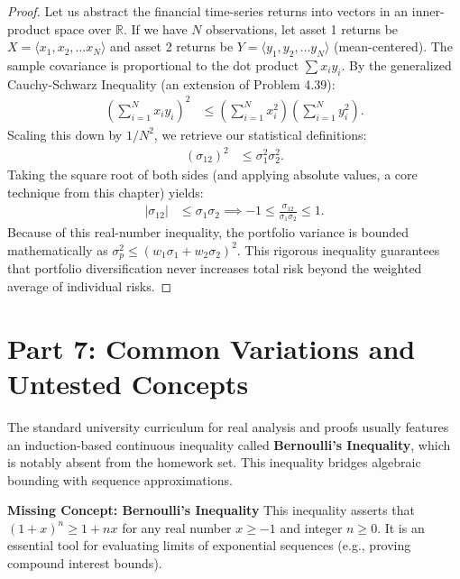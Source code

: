 \documentclass[11pt]{article}
\theoremstyle{definition}
\theoremstyle{remark}
\begin{document}
\begin{itemize}
\begin{proof}
Let us abstract the financial time-series returns into vectors in an inner-product space over $\mathbb{R}$. If we have $N$ observations, let asset 1 returns be $X = \langle x_1, x_2, \dots x_N \rangle$ and asset 2 returns be $Y = \langle y_1, y_2, \dots y_N \rangle$ (mean-centered). 
The sample covariance is proportional to the dot product $\sum x_i y_i$. 
By the generalized Cauchy-Schwarz Inequality (an extension of Problem 4.39):
\begin{align*}
    \left( \sum_{i=1}^N x_i y_i \right)^2 &\le \left( \sum_{i=1}^N x_i^2 \right) \left( \sum_{i=1}^N y_i^2 \right).
\end{align*}
Scaling this down by $1/N^2$, we retrieve our statistical definitions:
\begin{align*}
    (\sigma_{12})^2 &\le \sigma_1^2 \sigma_2^2.
\end{align*}
Taking the square root of both sides (and applying absolute values, a core technique from this chapter) yields:
\begin{align*}
    |\sigma_{12}| &\le \sigma_1 \sigma_2 \implies -1 \le \frac{\sigma_{12}}{\sigma_1 \sigma_2} \le 1.
\end{align*}
Because of this real-number inequality, the portfolio variance is bounded mathematically as $\sigma_p^2 \le (w_1\sigma_1 + w_2\sigma_2)^2$. This rigorous inequality guarantees that portfolio diversification never increases total risk beyond the weighted average of individual risks.
\end{proof}

\newpage
\section{Part 7: Common Variations and Untested Concepts}

The standard university curriculum for real analysis and proofs usually features an induction-based continuous inequality called \textbf{Bernoulli's Inequality}, which is notably absent from the homework set. This inequality bridges algebraic bounding with sequence approximations.

\textbf{Missing Concept: Bernoulli's Inequality}
This inequality asserts that $(1+x)^n \ge 1+nx$ for any real number $x \ge -1$ and integer $n \ge 0$. It is an essential tool for evaluating limits of exponential sequences (e.g., proving compound interest bounds).


\end{itemize}
\end{document}
